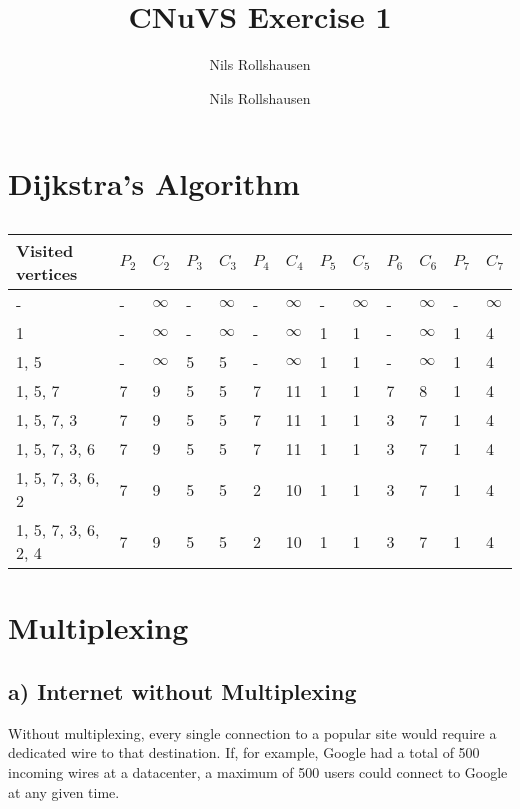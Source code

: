 \documentclass[a4paper, 11 pt, article, accentcolor=tud7b]{tudreport}
\title{CNuVS Exercise 1}
\author{Nils Rollshausen}
\subtitle{Nils Rollshausen}
\begin{document}
	\maketitle
	\section{Dijkstra's Algorithm}
	
	\begin{longtable}[c]{l|ll|ll|ll|ll|ll|ll}
		\caption{}
		\label{Dijkstra}\\
		Visited vertices    & $P_2$ & $C_2$ & $P_3$ & $C_3$ & $P_4$ & $C_4$ & $P_5$ & $C_5$ & $P_6$ & $C_6$ & $P_7$ & $C_7$ \\ \hline
		\endfirsthead
		\endhead
		-                   & -    & $\infty$     & -    & $\infty$     & -    & $\infty$     & -    & $\infty$     & -    & $\infty$     & -    &  $\infty$    \\
		1                   & -    & $\infty$     & -    & $\infty$     & -    & $\infty$     & 1    & 1    & -    & $\infty$     &  1    & 4    \\
		1, 5                & -    & $\infty$     & 5    & 5    & -    & $\infty$     & 1    & 1    & -    & $\infty$     & 1    & 4    \\
		1, 5, 7             & 7    & 9    & 5    & 5    & 7    & 11   & 1    & 1    & 7    & 8    & 1    & 4    \\
		1, 5, 7, 3          & 7    & 9    & 5    & 5    & 7    & 11   & 1    & 1    & 3    & 7    & 1    & 4    \\
		1, 5, 7, 3, 6       & 7    & 9    & 5    & 5    & 7    & 11   & 1    & 1    & 3    & 7    & 1    & 4    \\
		1, 5, 7, 3, 6, 2    & 7    & 9    & 5    & 5    & 2    & 10   & 1    & 1    & 3    & 7    & 1    & 4    \\
		1, 5, 7, 3, 6, 2, 4 & 7    & 9    & 5    & 5    & 2    & 10   & 1    & 1    & 3    & 7    & 1    & 4   
	\end{longtable}
	
	\section{Multiplexing}
	\subsection*{a) Internet without Multiplexing}
	Without multiplexing, every single connection to a popular site would require a dedicated wire to that destination. If, for example, Google had a total of 500 incoming wires at a datacenter, a maximum of 500 users could connect to Google at any given time.
\end{document}
